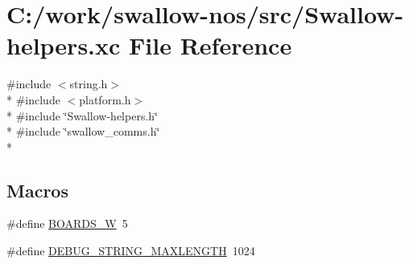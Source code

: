 \hypertarget{_swallow-helpers_8xc}{}\section{C\+:/work/swallow-\/nos/src/\+Swallow-\/helpers.xc File Reference}
\label{_swallow-helpers_8xc}
{\ttfamily \#include $<$string.\+h$>$}\\*
{\ttfamily \#include $<$platform.\+h$>$}\\*
{\ttfamily \#include \char`\"{}Swallow-\/helpers.\+h\char`\"{}}\\*
{\ttfamily \#include \char`\"{}swallow\+\_\+comms.\+h\char`\"{}}\\*
\subsection*{Macros}
\begin{DoxyCompactItemize}
\item 
\#define \hyperlink{_swallow-helpers_8xc_af6442d33deb8d3d0dcb8ee5c37f65a17}{B\+O\+A\+R\+D\+S\+\_\+\+W}~5
\item 
\#define \hyperlink{_swallow-helpers_8xc_aef2d817325c72b838c4f25e92bdc8134}{D\+E\+B\+U\+G\+\_\+\+S\+T\+R\+I\+N\+G\+\_\+\+M\+A\+X\+L\+E\+N\+G\+T\+H}~1024
\end{DoxyCompactItemize}
